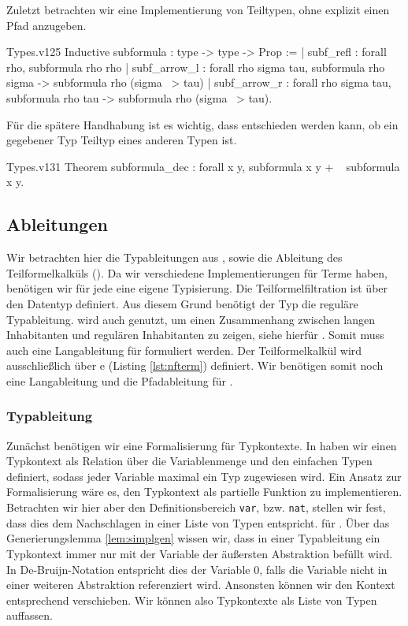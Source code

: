 Zuletzt betrachten wir eine Implementierung von Teiltypen, ohne explizit einen Pfad anzugeben.
\begin{code}[subformula]{Types.v}{}{125}
Inductive subformula : type -> type -> Prop :=
  | subf_refl : forall rho, subformula rho rho
  | subf_arrow_l : forall rho sigma tau, 
      subformula rho sigma -> subformula rho (sigma ~> tau)
  | subf_arrow_r : forall rho sigma tau, 
      subformula rho tau -> subformula rho (sigma ~> tau).
\end{code}

Für die spätere Handhabung ist es wichtig, dass entschieden werden kann, ob ein gegebener Typ Teiltyp eines anderen Typen ist.

\begin{code}{Types.v}{}{131}
Theorem subformula_dec : forall x y, 
    {subformula x y} + { ~ subformula x y}.
\end{code}

\subsection{Ableitungen}
Wir betrachten hier die Typableitungen aus , sowie die Ableitung des Teilformelkalküls (). Da wir verschiedene Implementierungen für Terme haben, benötigen wir für jede eine eigene Typisierung. Die Teilformelfiltration ist über den Datentyp  definiert. Aus diesem Grund benötigt der Typ  die reguläre Typableitung.  wird auch genutzt, um einen Zusammenhang zwischen langen Inhabitanten und regulären Inhabitanten zu zeigen, siehe hierfür . Somit muss auch eine Langableitung für  formuliert werden. Der Teilformelkalkül wird ausschließlich über e (Listing \ref{lst:nfterm}) definiert. Wir benötigen somit noch eine Langableitung und die Pfadableitung für .

\subsubsection{Typableitung}

Zunächst benötigen wir eine Formalisierung für Typkontexte. In  haben wir einen Typkontext als Relation über die Variablenmenge und den einfachen Typen definiert, sodass jeder Variable maximal ein Typ zugewiesen wird. Ein Ansatz zur Formalisierung wäre es, den Typkontext als partielle Funktion  zu implementieren. Betrachten wir hier aber den Definitionsbereich \texttt{var}, bzw. \texttt{nat}, stellen wir fest, dass dies dem Nachschlagen in einer Liste von Typen entspricht.  für . Über das Generierungslemma \ref{lem:simplgen} wissen wir, dass in einer Typableitung ein Typkontext immer nur mit der Variable der äußersten Abstraktion befüllt wird. In De-Bruijn-Notation entspricht dies der Variable $0$, falls die Variable nicht in einer weiteren Abstraktion referenziert wird. Ansonsten können wir den Kontext entsprechend verschieben. Wir können also Typkontexte als Liste von Typen auffassen.

